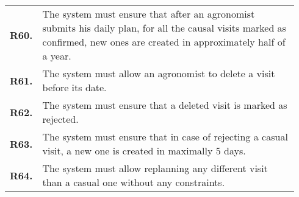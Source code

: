 \begin{longtable}{@{}p{0.06\linewidth} p{0.88\linewidth}}
	\textbf{R60.} & The system must ensure that after an agronomist submits his daily plan, for all the causal visits marked as confirmed, new ones are created in approximately half of a year.\\
	\textbf{R61.} & The system must allow an agronomist to delete a visit before its date.\\
	\textbf{R62.} & The system must ensure that a deleted visit is marked as rejected.\\
	\textbf{R63.} & The system must ensure that in case of rejecting a casual visit, a new one is created in maximally 5 days.\\
	\textbf{R64.} & The system must allow replanning any different visit than a casual one without any constraints.\\
		
	\bottomrule
\end{longtable}
